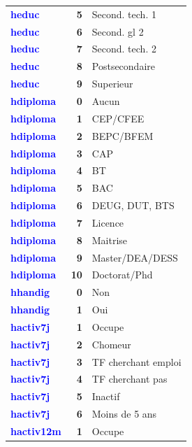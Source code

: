 \documentclass[
]{article}
\begin{document}
\begin{longtable}[t]{>{}l>{}r>{\raggedright\arraybackslash}p{8cm}}
\textcolor{blue}{\textbf{heduc}} & \textbf{5} & Second. tech. 1\\
\textcolor{blue}{\textbf{heduc}} & \textbf{6} & Second. gl 2\\
\addlinespace
\textcolor{blue}{\textbf{heduc}} & \textbf{7} & Second. tech. 2\\
\textcolor{blue}{\textbf{heduc}} & \textbf{8} & Postsecondaire\\
\textcolor{blue}{\textbf{heduc}} & \textbf{9} & Superieur\\
\textcolor{blue}{\textbf{hdiploma}} & \textbf{0} & Aucun\\
\textcolor{blue}{\textbf{hdiploma}} & \textbf{1} & CEP/CFEE\\
\addlinespace
\textcolor{blue}{\textbf{hdiploma}} & \textbf{2} & BEPC/BFEM\\
\textcolor{blue}{\textbf{hdiploma}} & \textbf{3} & CAP\\
\textcolor{blue}{\textbf{hdiploma}} & \textbf{4} & BT\\
\textcolor{blue}{\textbf{hdiploma}} & \textbf{5} & BAC\\
\textcolor{blue}{\textbf{hdiploma}} & \textbf{6} & DEUG, DUT, BTS\\
\addlinespace
\textcolor{blue}{\textbf{hdiploma}} & \textbf{7} & Licence\\
\textcolor{blue}{\textbf{hdiploma}} & \textbf{8} & Maitrise\\
\textcolor{blue}{\textbf{hdiploma}} & \textbf{9} & Master/DEA/DESS\\
\textcolor{blue}{\textbf{hdiploma}} & \textbf{10} & Doctorat/Phd\\
\textcolor{blue}{\textbf{hhandig}} & \textbf{0} & Non\\
\addlinespace
\textcolor{blue}{\textbf{hhandig}} & \textbf{1} & Oui\\
\textcolor{blue}{\textbf{hactiv7j}} & \textbf{1} & Occupe\\
\textcolor{blue}{\textbf{hactiv7j}} & \textbf{2} & Chomeur\\
\textcolor{blue}{\textbf{hactiv7j}} & \textbf{3} & TF cherchant emploi\\
\textcolor{blue}{\textbf{hactiv7j}} & \textbf{4} & TF cherchant pas\\
\addlinespace
\textcolor{blue}{\textbf{hactiv7j}} & \textbf{5} & Inactif\\
\textcolor{blue}{\textbf{hactiv7j}} & \textbf{6} & Moins de 5 ans\\
\textcolor{blue}{\textbf{hactiv12m}} & \textbf{1} & Occupe\\

\end{longtable}
\end{document}

